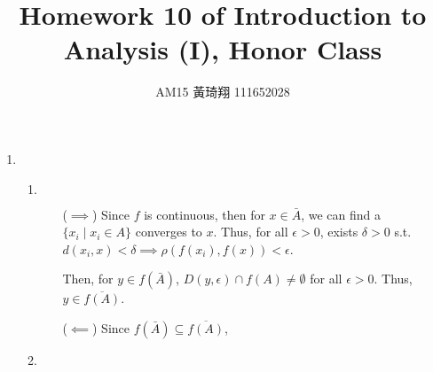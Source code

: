 \documentclass[12pt]{article}
\title{Homework 10 of Introduction to Analysis (I), Honor Class}
\author{AM15 黃琦翔 111652028}
\begin{document}
\maketitle
\begin{enumerate}
    \item \begin{enumerate}
        \item $\ $
        \begin{enumerate}
            \item[($\implies$)] Since $f$ is continuous, then for $x\in \bar{A}$, 
            we can find a $\lbrace x_i\mid x_i\in A\rbrace$ converges to $x$.
            Thus, for all $\epsilon > 0$, exists $\delta > 0$ s.t. $d(x_i, x) < \delta \implies \rho(f(x_i), f(x)) < \epsilon$.

            Then, for $y \in f(\bar{A})$, $D(y, \epsilon)\cap f(A) \neq \emptyset$ for all $\epsilon > 0$.
            Thus, $y \in \overline{f(A)}$.
            
            \item[($\impliedby$)] Since $f(\bar{A})\subseteq \overline{f(A)}$, 
        \end{enumerate}

        \item 
    \end{enumerate}
\end{enumerate}
\end{document}
